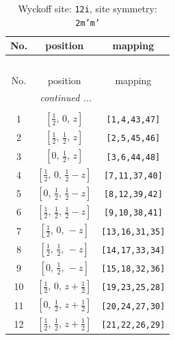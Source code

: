 \documentclass[fleqn,8pt]{jsarticle}
\begin{document}
\begin{longtable}{ccc}
\caption{Wyckoff site: {\tt 12i}, site symmetry: {\tt 2m'm'}}
 \\
 \hline \hline
No. & position & mapping \\ \hline \endfirsthead

\multicolumn{2}{l}{\tablename\ \thetable{}} \\
 \hline \hline
No. & position & mapping \\ \hline \endhead

 \hline \hline
\multicolumn{2}{r}{\footnotesize\it continued ...} \\ \endfoot

 \hline \hline
\multicolumn{2}{r}{} \\ \endlastfoot

1 & $\left[ \frac{1}{2},\, 0,\, z \right]$ & {\tt [1,4,43,47]} \\ \hline
2 & $\left[ \frac{1}{2},\, \frac{1}{2},\, z \right]$ & {\tt [2,5,45,46]} \\ \hline
3 & $\left[ 0,\, \frac{1}{2},\, z \right]$ & {\tt [3,6,44,48]} \\ \hline
4 & $\left[ \frac{1}{2},\, 0,\, \frac{1}{2} - z \right]$ & {\tt [7,11,37,40]} \\ \hline
5 & $\left[ 0,\, \frac{1}{2},\, \frac{1}{2} - z \right]$ & {\tt [8,12,39,42]} \\ \hline
6 & $\left[ \frac{1}{2},\, \frac{1}{2},\, \frac{1}{2} - z \right]$ & {\tt [9,10,38,41]} \\ \hline
7 & $\left[ \frac{1}{2},\, 0,\, - z \right]$ & {\tt [13,16,31,35]} \\ \hline
8 & $\left[ \frac{1}{2},\, \frac{1}{2},\, - z \right]$ & {\tt [14,17,33,34]} \\ \hline
9 & $\left[ 0,\, \frac{1}{2},\, - z \right]$ & {\tt [15,18,32,36]} \\ \hline
10 & $\left[ \frac{1}{2},\, 0,\, z + \frac{1}{2} \right]$ & {\tt [19,23,25,28]} \\ \hline
11 & $\left[ 0,\, \frac{1}{2},\, z + \frac{1}{2} \right]$ & {\tt [20,24,27,30]} \\ \hline
12 & $\left[ \frac{1}{2},\, \frac{1}{2},\, z + \frac{1}{2} \right]$ & {\tt [21,22,26,29]} \\
\end{longtable}
\renewcommand{\arraystretch}{1.2}
\end{document}
